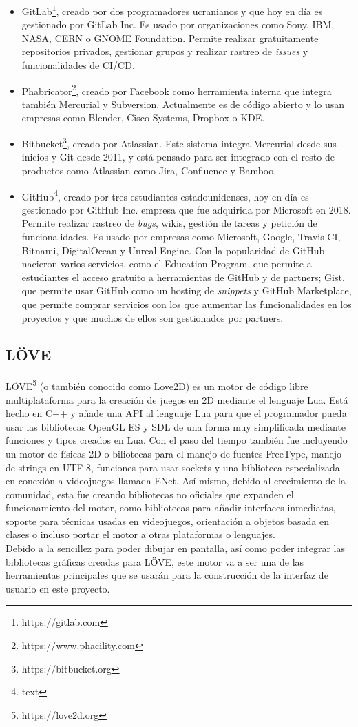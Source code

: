\begin{itemize}
	\item GitLab\footnote{https://gitlab.com}, creado por dos programadores ucranianos y que hoy en día es gestionado por GitLab Inc. Es usado por organizaciones como Sony, IBM, NASA, CERN o GNOME Foundation. Permite realizar gratuitamente repositorios privados, gestionar grupos y realizar rastreo de \textit{issues} y funcionalidades de CI/CD.
	\item Phabricator\footnote{https://www.phacility.com}, creado por Facebook como herramienta interna que integra también Mercurial y Subversion. Actualmente es de código abierto y lo usan empresas como Blender, Cisco Systems, Dropbox o KDE.
	\item Bitbucket\footnote{https://bitbucket.org}, creado por Atlassian. Este sistema integra Mercurial desde sus inicios y Git desde 2011, y está pensado para ser integrado con el resto de productos como Atlassian como Jira, Confluence y Bamboo.
	\item GitHub\footnote{text}, creado por tres estudiantes estadounidenses, hoy en día es gestionado por GitHub Inc. empresa que fue adquirida por Microsoft en 2018. Permite realizar rastreo de \textit{bugs}, wikis, gestión de tareas y petición de funcionalidades. Es usado por empresas como Microsoft, Google, Travis CI, Bitnami, DigitalOcean y Unreal Engine. Con la popularidad de GitHub nacieron varios servicios, como el Education Program, que permite a estudiantes el acceso gratuito a herramientas de GitHub y de partners; Gist, que permite usar GitHub como un hosting de \textit{snippets} y GitHub Marketplace, que permite comprar servicios con los que aumentar las funcionalidades en los proyectos y que muchos de ellos son gestionados por partners.
\end{itemize}

\subsection{LÖVE}\label{subsec:love2d}

LÖVE\footnote{https://love2d.org} (o también conocido como Love2D) es un motor de código libre multiplataforma para la creación de juegos en 2D mediante el lenguaje Lua. Está hecho en C++ y añade una API al lenguaje Lua para que el programador pueda usar las bibliotecas OpenGL ES y SDL de una forma muy simplificada mediante funciones y tipos creados en Lua. Con el paso del tiempo también fue incluyendo un motor de físicas 2D o biliotecas para el manejo de fuentes FreeType, manejo de strings en UTF-8, funciones para usar sockets y una biblioteca especializada en conexión a videojuegos llamada ENet. Así mismo, debido al crecimiento de la comunidad, esta fue creando bibliotecas no oficiales que expanden el funcionamiento del motor, como bibliotecas para añadir interfaces inmediatas, soporte para técnicas usadas en videojuegos, orientación a objetos basada en clases o incluso portar el motor a otras plataformas o lenguajes. \\

Debido a la sencillez para poder dibujar en pantalla, así como poder integrar las bibliotecas gráficas creadas para LÖVE, este motor va a ser una de las herramientas principales que se usarán para la construcción de la interfaz de usuario en este proyecto.